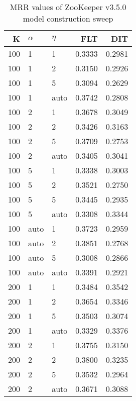 
\begin{table}
\begin{spacing}{1.2}
\centering
\caption{MRR values of ZooKeeper v3.5.0 model construction sweep}
\label{table:zookeeper_model_sweep}
\vspace{0.2em}
\parbox{.45\linewidth}{\centering \begin{tabular}{rll|rr}
\toprule
   K & $\alpha$ &   $\eta$ & FLT & DIT \\
\midrule
 100 &     1 &     1 &           0.3333 & 0.2981 \\
 100 &     1 &     2 &           0.3150 & 0.2926 \\
 100 &     1 &     5 &           0.3094 & 0.2629 \\
 100 &     1 &  auto &           0.3742 & 0.2808 \\
 100 &     2 &     1 &           0.3678 & 0.3049 \\
 100 &     2 &     2 &           0.3426 & 0.3163 \\
 100 &     2 &     5 &           0.3709 & 0.2753 \\
 100 &     2 &  auto &           0.3405 & 0.3041 \\
 100 &     5 &     1 &           0.3338 & 0.3003 \\
 100 &     5 &     2 &           0.3521 & 0.2750 \\
 100 &     5 &     5 &           0.3445 & 0.2935 \\
 100 &     5 &  auto &           0.3308 & 0.3344 \\
 100 &  auto &     1 &           0.3723 & 0.2959 \\
 100 &  auto &     2 &           0.3851 & 0.2768 \\
 100 &  auto &     5 &           0.3008 & 0.2866 \\
 100 &  auto &  auto &           0.3391 & 0.2921 \\
 200 &     1 &     1 &           0.3484 & 0.3542 \\
 200 &     1 &     2 &           0.3654 & 0.3346 \\
 200 &     1 &     5 &           0.3503 & 0.3074 \\
 200 &     1 &  auto &           0.3329 & 0.3376 \\
 200 &     2 &     1 &           0.3755 & 0.3150 \\
 200 &     2 &     2 &           0.3800 & 0.3235 \\
 200 &     2 &     5 &           0.3532 & 0.2964 \\
 200 &     2 &  auto &           0.3671 & 0.3088 \\

\end{tabular}}
\end{spacing}
\end{table}
